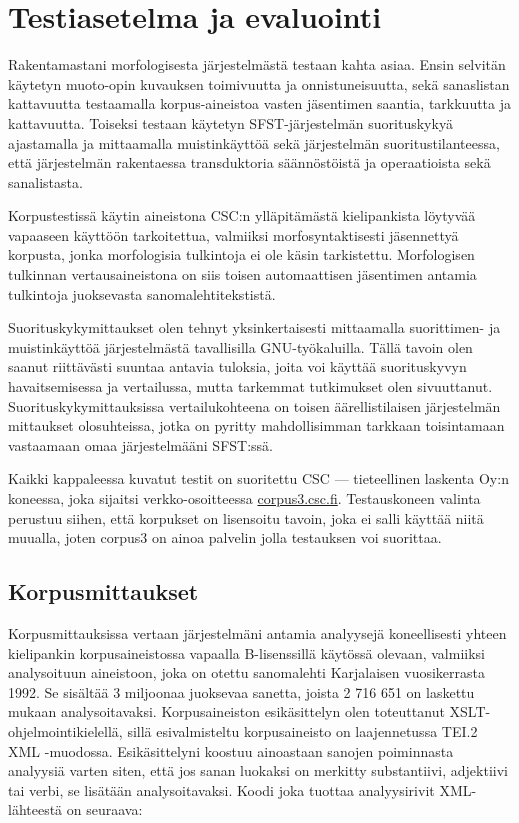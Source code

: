 \documentclass[free]{flammie}
\begin{document}
\section{Testiasetelma ja evaluointi} \label{sec:evaluointi}

Rakentamastani morfologisesta järjestelmästä testaan kahta asiaa. Ensin selvitän
käytetyn muoto-opin kuvauksen toimivuutta ja onnistuneisuutta, sekä sanaslistan
kattavuutta testaamalla korpus-aineistoa vasten jäsentimen saantia, tarkkuutta ja
kattavuutta. Toiseksi testaan käytetyn SFST-järjestelmän suorituskykyä ajastamalla ja mittaamalla muistinkäyttöä sekä järjestelmän suoritustilanteessa, että järjestelmän rakentaessa transduktoria säännöstöistä ja operaatioista sekä sanalistasta.

Korpustestissä käytin aineistona CSC:n ylläpitämästä kielipankista löytyvää vapaaseen käyttöön tarkoitettua, valmiiksi morfosyntaktisesti jäsennettyä korpusta,
jonka morfologisia tulkintoja ei ole käsin tarkistettu. Morfologisen tulkinnan vertausaineistona on siis toisen automaattisen jäsentimen antamia tulkintoja juoksevasta sanomalehtitekstistä.

Suorituskykymittaukset olen tehnyt yksinkertaisesti mittaamalla suorittimen- ja
muistinkäyttöä järjestelmästä tavallisilla GNU-työkaluilla. Tällä tavoin olen saanut riittävästi suuntaa antavia tuloksia, joita voi käyttää suorituskyvyn havaitsemisessa ja vertailussa, mutta tarkemmat tutkimukset olen sivuuttanut. Suorituskykymittauksissa vertailukohteena on toisen äärellistilaisen järjestelmän mittaukset
olosuhteissa, jotka on pyritty mahdollisimman tarkkaan toisintamaan vastaamaan
omaa järjestelmääni SFST:ssä.

Kaikki kappaleessa kuvatut testit on suoritettu CSC — tieteellinen laskenta Oy:n
koneessa, joka sijaitsi verkko-osoitteessa \url{corpus3.csc.fi}. Testauskoneen
valinta perustuu siihen, että korpukset on lisensoitu tavoin, joka ei salli käyttää
niitä muualla, joten corpus3 on ainoa palvelin jolla testauksen voi suorittaa.

\subsection{Korpusmittaukset} \label{subsec:korpusmittaukset}

Korpusmittauksissa vertaan järjestelmäni antamia analyysejä koneellisesti yhteen
kielipankin korpusaineistossa vapaalla B-lisenssillä käytössä olevaan, valmiiksi
analysoituun aineistoon, joka on otettu sanomalehti Karjalaisen vuosikerrasta
1992. Se sisältää 3 miljoonaa juoksevaa sanetta, joista 2 716 651 on laskettu
mukaan analysoitavaksi. Korpusaineiston esikäsittelyn olen toteuttanut XSLT-ohjelmointikielellä, sillä esivalmisteltu korpusaineisto on laajennetussa TEI.2
XML -muodossa. Esikäsittelyni koostuu ainoastaan sanojen poiminnasta analyysiä varten siten, että jos sanan luokaksi on merkitty substantiivi, adjektiivi tai verbi, se lisätään analysoitavaksi. Koodi joka tuottaa analyysirivit XML-lähteestä on
seuraava:
\end{document}
